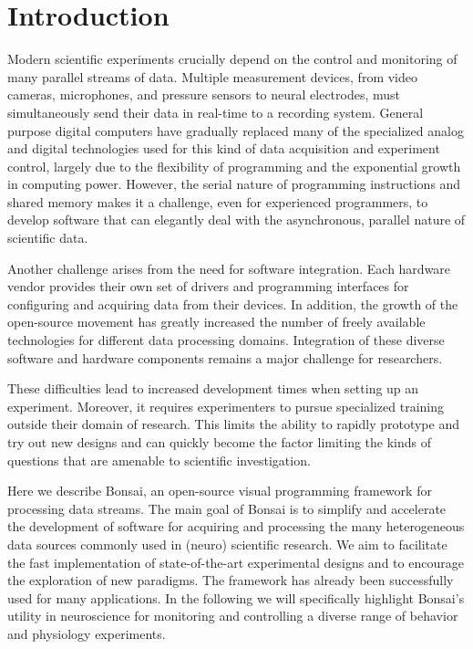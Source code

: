 				
\section{Introduction}

Modern scientific experiments crucially depend on the control and monitoring of many parallel streams of data. Multiple measurement devices, from video cameras, microphones, and pressure sensors to neural electrodes, must simultaneously send their data in real-time to a recording system. General purpose digital computers have gradually replaced many of the specialized analog and digital technologies used for this kind of data acquisition and experiment control, largely due to the flexibility of programming and the exponential growth in computing power. However, the serial nature of programming instructions and shared memory makes it a challenge, even for experienced programmers, to develop software that can elegantly deal with the asynchronous, parallel nature of scientific data.

Another challenge arises from the need for software integration. Each hardware vendor provides their own set of drivers and programming interfaces for configuring and acquiring data from their devices. In addition, the growth of the open-source movement has greatly increased the number of freely available technologies for different data processing domains. Integration of these diverse software and hardware components remains a major challenge for researchers.

These difficulties lead to increased development times when setting up an experiment. Moreover, it requires experimenters to pursue specialized training outside their domain of research. This limits the ability to rapidly prototype and try out new designs and can quickly become the factor limiting the kinds of questions that are amenable to scientific investigation.

Here we describe Bonsai, an open-source visual programming framework for processing data streams. The main goal of Bonsai is to simplify and accelerate the development of software for acquiring and processing the many heterogeneous data sources commonly used in (neuro) scientific research. We aim to facilitate the fast implementation of state-of-the-art experimental designs and to encourage the exploration of new paradigms. The framework has already been successfully used for many applications. In the following we will specifically highlight Bonsai's utility in neuroscience for monitoring and controlling a diverse range of behavior and physiology experiments.

